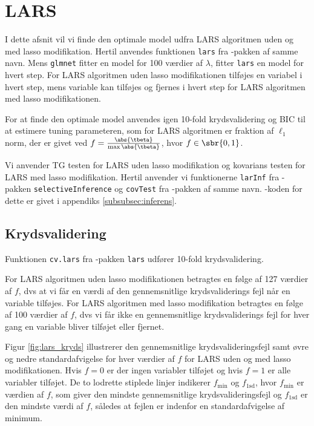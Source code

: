 \section{LARS}
I dette afsnit vil vi finde den optimale model udfra LARS algoritmen uden og med lasso modifikation. 
Hertil anvendes funktionen \texttt{lars} fra \Rlang-pakken af samme navn.
Mens \texttt{glmnet} fitter en model for 100 værdier af \(\lambda\), fitter \texttt{lars} en model for hvert step.
For LARS algoritmen uden lasso modifikationen tilføjes en variabel i hvert step, mens variable kan tilføjes og fjernes i hvert step for LARS algoritmen med lasso modifikationen.

For at finde den optimale model anvendes igen 10-fold krydsvalidering og BIC til at estimere tuning parameteren, som for LARS algoritmen er fraktion af \(\ell_1\) norm, der er givet ved \(f = \frac{\abs{\tbeta}}{\max \abs{\tbeta}}\), hvor \(f \in \sbr{0,1}\).


Vi anvender TG testen for LARS uden lasso modifikation og kovarians testen for LARS med lasso modifikation.   
Hertil anvender vi funktionerne \texttt{larInf} fra \Rlang-pakken \texttt{selectiveInference} og \texttt{covTest} fra \Rlang-pakken af samme navn. 
\Rlang-koden for dette er givet i appendiks \ref{subsubsec:inferens}.


\subsection{Krydsvalidering}
Funktionen \texttt{cv.lars} fra \Rlang-pakken \texttt{lars} udfører 10-fold krydsvalidering.

For LARS algoritmen uden lasso modifikationen betragtes en følge af 127 værdier af $f$, dvs at vi får en værdi af den gennemsnitlige krydsvaliderings fejl når en variable tilføjes.
For LARS algoritmen med lasso modifikation betragtes en følge af 100 værdier af $f$, dvs vi får ikke en gennemsnitlige krydsvaliderings fejl for hver gang en variable bliver tilføjet eller fjernet. 

Figur \ref{fig:lars_kryds} illustrerer den gennemsnitlige krydsvalideringsfejl samt øvre og nedre standardafvigelse for hver værdier af $f$ for LARS uden og med lasso modifikationen.
Hvis $f = 0$ er der ingen variabler tilføjet og hvis $f=1$ er alle variabler tilføjet. 
De to lodrette stiplede linjer indikerer \(f_{\text{min}}\) og \(f_\text{1sd}\), hvor \(f_{\text{min}}\) er værdien af \(f\), som giver den mindste gennemsnitlige krydsvalideringsfejl og \(f_\text{1sd}\) er den mindste værdi af \(f\), således at fejlen er indenfor en standardafvigelse af minimum. 


